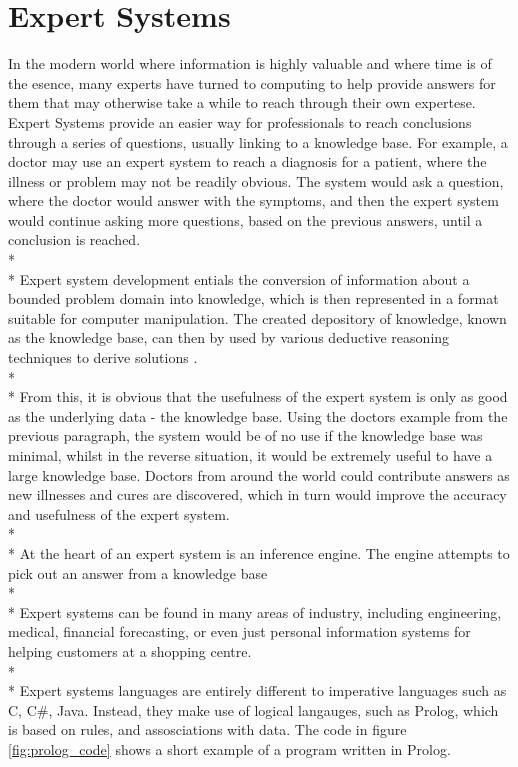 \documentclass[12pt]{report}
\begin{document}
\section{Expert Systems}\label{sec:expert_systems}
In the modern world where information is highly valuable and where time is of the esence, many experts have turned to computing to help provide answers for them that may otherwise take a while to reach through their own expertese.  Expert Systems provide an easier way for professionals to reach conclusions through a series of questions, usually linking to a knowledge base.  For example, a doctor may use an expert system to reach a diagnosis for a patient, where the illness or problem may not be readily obvious.  The system would ask a question, where the doctor would answer with the symptoms, and then the expert system would continue asking more questions, based on the previous answers, until a conclusion is reached.
\\*
\\*
Expert system development entials the conversion of information about a bounded problem domain into knowledge, which is then represented in a format suitable for computer manipulation.  The created depository of knowledge, known as the knowledge base, can then by used by various deductive reasoning techniques to derive solutions \citep{expertsystems98}.
\\*
\\*
From this, it is obvious that the usefulness of the expert system is only as good as the underlying data - the knowledge base.  Using the doctors example from the previous paragraph, the system would be of no use if the knowledge base was minimal, whilst in the reverse situation, it would be extremely useful to have a large knowledge base.  Doctors from around the world could contribute answers as new illnesses and cures are discovered, which in turn would improve the accuracy and usefulness of the expert system.
\\*
\\*
At the heart of an expert system is an inference engine.  The engine attempts to pick out an answer from a knowledge base
\\*
\\*
Expert systems can be found in many areas of industry, including engineering, medical, financial forecasting, or even just personal information systems for helping customers at a shopping centre.
\\*
\\*
Expert systems languages are entirely different to imperative languages such as C, C\#, Java.  Instead, they make use of logical langauges, such as Prolog, which is based on rules, and assosciations with data.  The code in figure \ref{fig:prolog_code} shows a short example of a program written in Prolog.
\end{document}
